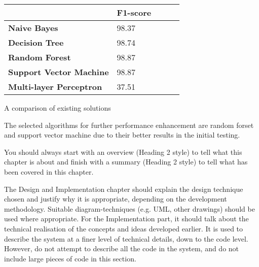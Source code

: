 \begin{singlespace}
	\small
	\begin{center}
		\label{tab:FIRST_TRAINED_MODELS}
		\begin{tabular}{ | m{8em} | m{13em} | m{8.5em} | m{2.3em} | m{5em} | }
			\hline
			                                & \textbf{F1-score} \\
			\hline
			\textbf{Naive Bayes}            & 98.37             \\
			\hline
			\textbf{Decision Tree}          & 98.74             \\
			\hline
			\textbf{Random Forest}          & 98.87             \\
			\hline
			\textbf{Support Vector Machine} & 98.87             \\
			\hline
			\textbf{Multi-layer Perceptron} & 37.51             \\
			\hline
		\end{tabular}
		\captionsetup{type=table}\caption{A comparison of existing solutions \citep{INTELLIGENT_PHISHING_ANFIS}}
	\end{center}
\end{singlespace}

The selected algorithms for further performance enhancement are random forset and support vector machine due to their better results in the initial testing.









\iffalse
	You should always start with an overview (Heading 2 style) to tell what this chapter is about and finish with a summary (Heading 2 style) to tell what has been covered in this chapter.

	The Design and Implementation chapter should explain the design technique chosen and justify why it is appropriate, depending on the development methodology.  Suitable diagram-techniques (e.g. UML, other drawings) should be used where appropriate. For the Implementation part, it should talk about the technical realisation of the concepts and ideas developed earlier. It is used to describe the system at a finer level of technical details, down to the code level. However, do not attempt to describe all the code in the system, and do not include large pieces of code in this section.

